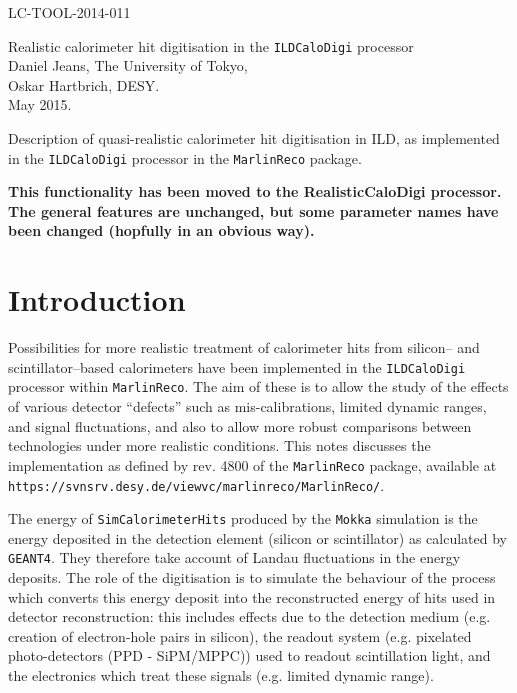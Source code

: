 \documentclass[12pt]{article} %
\begin{document}
{
\flushright
LC-TOOL-2014-011\\
}

\vspace{0.5cm}

{
\center
\Huge
Realistic calorimeter hit digitisation in the {\tt ILDCaloDigi} processor\\
}
%
\vspace{1cm}
%
{
\center
\Large
Daniel Jeans, The University of Tokyo, \\
Oskar Hartbrich, DESY.\\
}
%
\vspace{1cm}
%
{
 May 2015.\\
}

\vspace{1cm}

Description of quasi-realistic calorimeter hit digitisation in ILD, as implemented in
the {\tt ILDCaloDigi} processor in the {\tt MarlinReco} package.

\vspace{1cm}

{\bf This functionality has been moved to the RealisticCaloDigi processor.
The general features are unchanged, but some parameter names have been changed (hopfully in an obvious way).} \\



\section{Introduction}

Possibilities for more realistic treatment of calorimeter hits from silicon-- and scintillator--based calorimeters have been
implemented in the {\tt ILDCaloDigi} processor within {\tt MarlinReco}. The aim of these is to allow the study of the effects
of various detector ``defects'' such as mis-calibrations, limited dynamic ranges, and signal fluctuations,
and also to allow more robust comparisons between technologies under more realistic conditions.
This notes discusses the implementation as defined by rev. 4800 of the {\tt MarlinReco} package, available at
{\tt https://svnsrv.desy.de/viewvc/marlinreco/MarlinReco/}.

The energy of {\tt SimCalorimeterHits} produced by the {\tt Mokka} simulation is the energy deposited in the detection
element (silicon or scintillator) as calculated by {\tt GEANT4}. They therefore take account of Landau fluctuations
in the energy deposits.
The role of the digitisation is to simulate the behaviour of the process which converts this energy deposit into the
reconstructed energy of hits used in detector reconstruction: this includes effects due to the detection medium
(e.g. creation of electron-hole pairs in silicon),
the readout system (e.g. pixelated photo-detectors (PPD - SiPM/MPPC)) used to readout scintillation light,
and the electronics which treat these signals (e.g. limited dynamic range).
\end{document}
